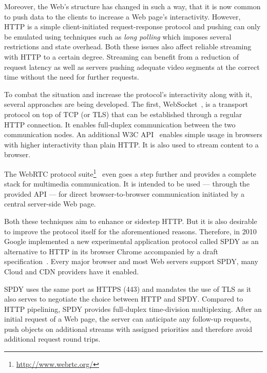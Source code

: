 Moreover, the Web's structure has changed in such a way, that it is now common to push data to the clients to increase a Web page's interactivity. However, \gls{HTTP} is a simple client-initiated request-response protocol and pushing can only be emulated using techniques such as \textit{long polling} which imposes several restrictions and state overhead. Both these issues also affect reliable streaming with \gls{HTTP} to a certain degree. Streaming can benefit from a reduction of request latency as well as servers pushing adequate video segments at the correct time without the need for further requests.

To combat the situation and increase the protocol's interactivity along with it, several approaches are being developed. The first, WebSocket~\cite{rfc6455}, is a transport protocol on top of \gls{TCP} (or \gls{TLS}) that can be established through a regular \gls{HTTP} connection. It enables full-duplex communication between the two communication nodes. An additional \gls{W3C} \gls{API}~\cite{w3c2011websockets} enables simple usage in browsers with higher interactivity than plain \gls{HTTP}. It is also used to stream content to a browser.

The \acrshort{WebRTC} protocol suite\footnote{\url{http://www.webrtc.org/}}~\cite{webrtcdraft} even goes a step further and provides a complete stack for multimedia communication. It is intended to be used --- through the provided \gls{API} --- for direct browser-to-browser communication initiated by a central server-side Web page.

Both these techniques aim to enhance or sidestep \gls{HTTP}. But it is also desirable to improve the protocol itself for the aforementioned reasons. Therefore, in 2010 Google implemented a new experimental application protocol called SPDY as an alternative to \gls{HTTP} in its browser Chrome accompanied by a draft specification~\cite{google2011SPDYdef, google2010SPDYwp}. Every major browser and most Web servers support SPDY, many Cloud and \gls{CDN} providers have it enabled.

SPDY uses the same port as \acrshort{HTTPS} (443) and mandates the use of \gls{TLS} as it also serves to negotiate the choice between \gls{HTTP} and SPDY. Compared to \gls{HTTP} pipelining, SPDY provides full-duplex time-division multiplexing. After an initial request of a Web page, the server can anticipate any follow-up requests, push objects on additional streams with assigned priorities and therefore avoid additional request round trips.

